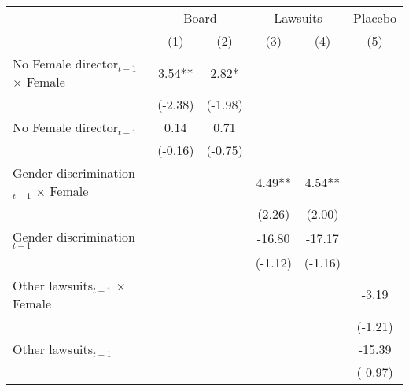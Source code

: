 {
\def\sym#1{\ifmmode^{#1}\else\(^{#1}\)\fi}
\begin{tabular*}{\hsize}{@{\hskip\tabcolsep\extracolsep\fill}l*{5}{c}}
\toprule
                &\multicolumn{2}{c}{Board}&\multicolumn{2}{c}{Lawsuits}&\multicolumn{1}{c}{Placebo}\\\cmidrule(lr){2-3}\cmidrule(lr){4-5}\cmidrule(lr){6-6}
                &\multicolumn{1}{c}{(1)}   &\multicolumn{1}{c}{(2)}   &\multicolumn{1}{c}{(3)}   &\multicolumn{1}{c}{(4)}   &\multicolumn{1}{c}{(5)}   \\
\midrule
No Female director\(_{t-1}\) $\times$ Female &    3.54** &    2.82*  &            &            &            \\
                &  (-2.38)   &  (-1.98)   &            &            &            \\
 

 
 
No Female director\(_{t-1}\)&    0.14   &    0.71   &            &            &            \\
                &  (-0.16)   &  (-0.75)   &            &            &            \\
 
Gender discrimination\(_{t-1}\) $\times$ Female&            &            &     4.49** &     4.54** &            \\
                &            &            &   (2.26)   &   (2.00)   &            \\
 
Gender discrimination\(_{t-1}\)&            &            &   -16.80   &   -17.17   &            \\
                &            &            &  (-1.12)   &  (-1.16)   &            \\
 
Other lawsuits\(_{t-1}\) $\times$ Female&            &            &            &            &    -3.19   \\
                &            &            &            &            &  (-1.21)   \\
 
Other lawsuits\(_{t-1}\)&            &            &            &            &   -15.39   \\
                &            &            &            &            &  (-0.97)   \\
 

\end{tabular*}}
